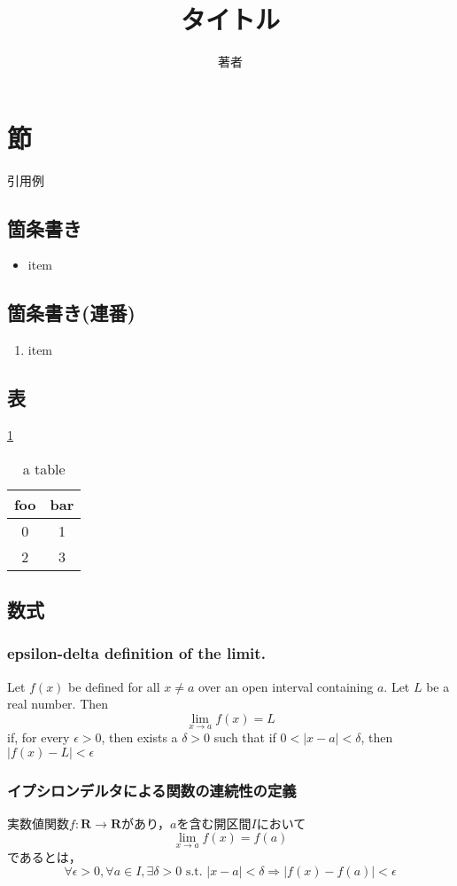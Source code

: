 \documentclass[12pt]{jsarticle}
\begin{document}
\title{タイトル}
\author{著者}
\maketitle

\section{節}
引用例\cite{Sample}

\subsection{箇条書き}
\begin{itemize}
  \item item
\end{itemize}

\subsection{箇条書き(連番)}
\begin{enumerate}
  \item item
\end{enumerate}

\subsection{表}
\ref{tb:table}

\begin{table}[htbp]
  \centering
  \caption{a table}
  \label{tb:table}
  \begin{tabular}{cc}
    \hline
    foo & bar \\
    \hline \hline
    0 & 1 \\
    2 & 3 \\
    \hline
  \end{tabular}
\end{table}

\subsection{数式}
\subsubsection{epsilon-delta definition of the limit.}
Let $f(x)$ be defined for all $x \neq a$ over an open interval containing $a$. Let $L$ be a real number. Then
$$\lim_{x \rightarrow a} f(x) = L$$
if, for every $\epsilon > 0$, then exists a $\delta > 0$ such that if $0 < |x - a| < \delta$, then $|f(x) - L| < \epsilon$

\subsubsection{イプシロンデルタによる関数の連続性の定義}
実数値関数$f: \mathbf{R} \rightarrow \mathbf{R}$があり，$a$を含む開区間$I$において
$$\lim_{x \rightarrow a} f(x) = f(a)$$
であるとは，
$$\forall \epsilon > 0, \forall a \in I, \exists \delta > 0 \mbox{ s.t. } |x - a| < \delta \Rightarrow |f(x) - f(a)| < \epsilon$$



\end{document}
